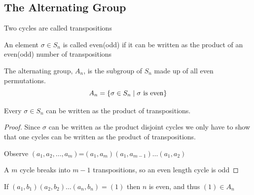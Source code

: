 \subsection{The Alternating Group}

\begin{definition}
    Two cycles are called transpositions
\end{definition}

\begin{definition}
    An element $\sigma\in S_n$ is called even(odd)
    if it can be written as the product of an even(odd) number
    of transpositions
\end{definition}

\begin{definition}
    The alternating group, $A_n$, is the subgroup
    of $S_n$ made up of all even permutations.
    \[A_n=\left\{ \sigma \in S_n \mid \sigma \text{ is even} \right\}\]
\end{definition}

\begin{proposition}
    Every $\sigma \in S_n$ can be written as the product of transpositions.
\end{proposition}

\begin{proof}
    Since $\sigma$ can be written as the product disjoint cycles we only have to
    show that one cycles can be written as the product of transpositions.

    Observe $(a_1,a_2,\dots,a_m)$=$(a_1,a_m)(a_1,a_{m-1})\dots(a_1,a_2)$

    A $m$ cycle breaks into $m-1$ transpositions, so an even length cycle is odd 
\end{proof}

\begin{proposition}
    If $(a_1,b_1)(a_2,b_2)\dots(a_n,b_n)=(1)$ then $n$ is even, and thus $(1)\in A_n$
\end{proposition}

